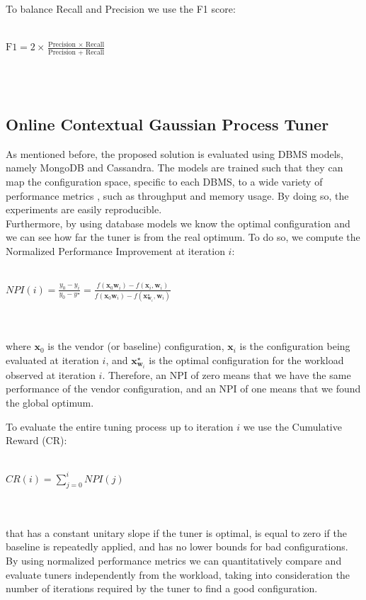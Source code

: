 \documentclass[a4paper, 12pt]{article} %
\begin{document}
	To balance Recall and Precision we use the F1 score:\\\\
	\centerline{
		$
		\text{F1} = 2 \times \frac{ \text{Precision } \times \text{ Recall}}{\text{Precision } + \text{ Recall}}
		$
	}\\\\
	
	\subsection{Online Contextual Gaussian Process Tuner } \label{ssec:exp_online_cgp}
	As mentioned before, the proposed solution is evaluated using DBMS models, namely MongoDB and Cassandra. The models are trained such that they can map the configuration space, specific to each DBMS, to a wide variety of performance metrics \cite{AkamasCGP}, such as throughput and memory usage. By doing so, the experiments are easily reproducible.\\	
	Furthermore, by using database models we know the optimal configuration and we can see how far the tuner is from the real optimum. To do so, we compute the Normalized Performance Improvement at iteration $i$:\\\\
	\centerline{
	$
	NPI(i) = \frac{y_0 - y_i}{y_0 - y^\star} = \frac{f(\pmb{x}_0 \pmb{w}_i) - f(\pmb{x}_i, \pmb{w}_i)}{f(\pmb{x}_0 \pmb{w}_i) - f(\pmb{x}_{\pmb{w}_i}^\star, \pmb{w}_i)}
	$
	}\\\\
	where $\pmb{x}_0$ is the vendor (or baseline) configuration, $\pmb{x}_i$ is the configuration being evaluated at iteration $i$, and $\pmb{x}_{\pmb{w}_i}^\star$ is the optimal configuration for the workload observed at iteration $i$. Therefore, an NPI of zero means that we have the same performance of the vendor configuration, and an NPI of one means that we found the global optimum. 
	
	To evaluate the entire tuning process up to iteration $i$ we use the Cumulative Reward (CR):\\\\
	\centerline{
		$
		CR(i) = \sum_{j=0}^{i} NPI(j)
		$
	}\\\\
	that has a constant unitary slope if the tuner is optimal, is equal to zero if the baseline is repeatedly applied, and has no lower bounds for bad configurations.\\
	By using normalized performance metrics we can quantitatively compare and evaluate tuners independently from the workload, taking into consideration the number of iterations required by the tuner to find a good configuration.
	
\end{document}
